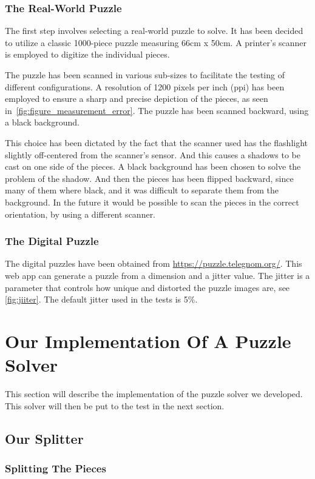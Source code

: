 \documentclass{article}
\begin{document}
\subsubsection{The Real-World Puzzle}
The first step involves selecting a real-world
puzzle to solve. It has been decided to utilize a
classic 1000-piece puzzle measuring 66cm x 50cm.
A printer's scanner is employed to digitize the individual pieces.

The puzzle has been scanned in various sub-sizes to facilitate the testing of different configurations.
A resolution of 1200 pixels per inch (ppi) has been employed to ensure a sharp and precise
depiction of the pieces, as seen in~\cref{fig:figure_measurement_error}.
The puzzle has been scanned backward, using a black background.

This choice has been dictated by the fact that the scanner used has the flashlight
slightly off-centered from the scanner's sensor.
And this causes a shadows to be cast on one side of the pieces.
A black background has been chosen to solve the problem of the shadow.
And then the pieces has been flipped backward, since many of them where black,
and it was difficult to separate them from the background.
In the future it would be possible to scan the pieces in the correct orientation,
by using a different scanner.

\subsubsection{The Digital Puzzle}
The digital puzzles have been obtained from \url{https://puzzle.telegnom.org/}.
This web app can generate a puzzle from a dimension and a jitter value. The jitter is a parameter that controls
how unique and distorted the puzzle images are, see \cref{fig:jiiter}.
The default jitter used in the tests is 5\%.

\section{Our Implementation Of A Puzzle Solver}

This section will describe the implementation of the puzzle solver we developed.
This solver will then be put to the test in the next section.

\subsection{Our Splitter}

\subsubsection{Splitting The Pieces}
\end{document}
